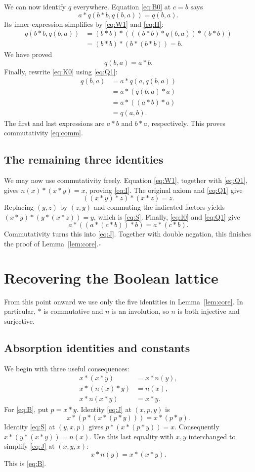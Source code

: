 \documentclass[11pt,a4paper]{article}
\begin{document}
We can now identify $q$ everywhere. Equation \eqref{eq:B0} at $c=b$ says
\[
 a*q(b*b,q(b,a))=q(b,a).
\]
Its inner expression simplifies by \eqref{eq:W1} and \eqref{eq:H}:
\[
 \begin{aligned}
 q(b*b,q(b,a))
   &=(b*b)*(((b*b)*q(b,a))*(b*b))\\
   &=(b*b)*(b*(b*b))=b.
 \end{aligned}
\]
We have proved
\begin{equation}
 \boxed{q(b,a)=a*b.}\tag{$Q_1$}\label{eq:Q1}
\end{equation}
Finally, rewrite \eqref{eq:K0} using \eqref{eq:Q1}:
\[
 \begin{aligned}
 q(b,a)&=a*q(a,q(b,a))\\
       &=a*(q(b,a)*a)\\
       &=a*((a*b)*a)\\
       &=q(a,b).
 \end{aligned}
\]
The first and last expressions are $a*b$ and $b*a$, respectively.
This proves commutativity \eqref{eq:comm}.

\subsection{The remaining three identities}
We may now use commutativity freely. Equation \eqref{eq:W1}, together
with \eqref{eq:Q1}, gives $n(x)*(x*y)=x$, proving \eqref{eq:I}.
The original axiom and \eqref{eq:Q1} give
\[
 ((x*y)*z)*(x*z)=z.
\]
Replacing $(y,z)$ by $(z,y)$ and commuting the indicated factors yields
$(x*y)*(y*(x*z))=y$, which is \eqref{eq:S}.
Finally, \eqref{eq:I0} and \eqref{eq:Q1} give
\[
 a*((a*(c*b))*b)=a*(c*b).
\]
Commutativity turns this into \eqref{eq:J}.
Together with double negation, this finishes the proof of
Lemma~\ref{lem:core}.\hfill$\square$

\section{Recovering the Boolean lattice}\label{sec:lattice}
From this point onward we use only the five identities in
Lemma~\ref{lem:core}. In particular, $*$ is commutative and $n$ is an
involution, so $n$ is both injective and surjective.

\subsection{Absorption identities and constants}
We begin with three useful consequences:
\begin{align}
 x*(x*y)&=x*n(y),\tag{B}\label{eq:B}\\
 x*(n(x)*y)&=n(x),\tag{I'}\label{eq:Iprime}\\
 x*n(x*y)&=x*y.\tag{A}\label{eq:A}
\end{align}
For \eqref{eq:B}, put $p=x*y$. Identity \eqref{eq:J} at $(x,p,y)$ is
\[
 x*(p*(x*(p*y)))=x*(p*y).
\]
Identity \eqref{eq:S} at $(y,x,p)$ gives $p*(x*(p*y))=x$.
Consequently $x*(y*(x*y))=n(x)$. Use this last equality with $x,y$
interchanged to simplify \eqref{eq:J} at $(x,y,x)$:
\[
 x*n(y)=x*(x*y).
\]
This is \eqref{eq:B}.
\end{document}
